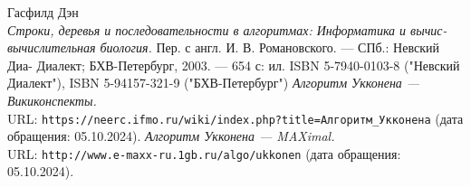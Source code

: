 \begin{thebibliography}{99}
Гасфилд Дэн\\
{\itshape Строки, деревья и последовательности в алгоритмах: Информатика и вычис-
вычислительная биология.}  Пер. с англ. И. В. Романовского. — СПб.: Невский Диа-
Диалект; БХВ-Петербург, 2003. — 654 с: ил. ISBN 5-7940-0103-8 ("Невский Диалект"), ISBN 5-94157-321-9 ("БХВ-Петербург")
{\itshape Алгоритм Укконена — Викиконспекты.} \\URL: \texttt{https://neerc.ifmo.ru/wiki/index.php?title=Алгоритм\_Укконена} (дата обращения: 05.10.2024).
{\itshape Алгоритм Укконена — MAXimal.} \\URL: \texttt{http://www.e-maxx-ru.1gb.ru/algo/ukkonen} (дата обращения: 05.10.2024).
\end{thebibliography}
\pagebreak
